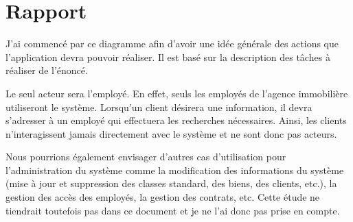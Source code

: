 \section{Rapport}

J'ai commencé par ce diagramme afin d'avoir une idée générale des actions que l'application devra pouvoir réaliser. Il est basé sur la description des tâches à réaliser de l'énoncé.

Le seul acteur sera l'employé. En effet, seuls les employés de l'agence immobilière utiliseront le système. Lorsqu'un client désirera une information, il devra s'adresser à un employé qui effectuera les recherches nécessaires. Ainsi, les clients n'interagissent jamais directement avec le système et ne sont donc pas acteurs.

Nous pourrions également envisager d'autres cas d'utilisation pour l'administration du système comme la modification des informations du système (mise à jour et suppression des classes standard, des biens, des clients, etc.), la gestion des accès des employés, la gestion des contrats, etc. Cette étude ne tiendrait toutefois pas dans ce document et je ne l'ai donc pas prise en compte.
